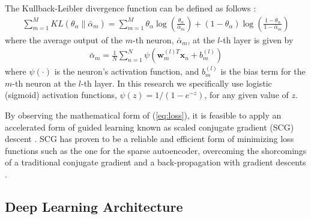 \documentclass[a4paper]{article}
\begin{document}
The Kullback-Leibler divergence function can be defined as follows
\cite{olshausen1997sparse}: 
\begin{align}
\sum^M_{m=1} KL \left( \theta_\alpha \left\| \bar{\alpha}_m \right. \right) = 
\sum^M_{m=1} \theta_\alpha \log \left( \frac{\theta_\alpha}{\bar{\alpha}_m} \right)
+ (1 - \theta_\alpha) \log \left( \frac{1-\theta_\alpha}{1-\bar{\alpha}_m} \right)
\label{eq:divergence}
\end{align}
where the average output of the $m$-th neuron, $\bar{\alpha}_m$, at the $l$-th
layer is given by
\begin{align}
\bar{\alpha}_m = \frac{1}{N} \sum^N_{n=1} \psi \left( \mathbf{w}^{(l)T}_m
\mathbf{x}_n + b^{(l)}_m \right)
\end{align}
where $\psi(\cdot)$ is the neuron's activation function, and
$b^{(l)}_m$ is the bias term for the $m$-th neuron at the $l$-th layer. 
In this research we specifically use logistic (sigmoid) activation functions,
$\psi(z) = 1/(1-e^{-z})$, for any given value of $z$. 

By observing the mathematical form of (\ref{eq:loss}), it is feasible to apply
an accelerated form of guided learning known as scaled conjugate gradient (SCG)
descent \cite{moller1993scaled}. SCG has proven to be a reliable and efficient
form of minimizing loss functions such as the one for the sparse autoencoder,
overcoming the shorcomings of a traditional conjugate gradient and
a back-propagation with gradient descents \cite{le2013building}. 


\subsection{Deep Learning Architecture}
\end{document}
